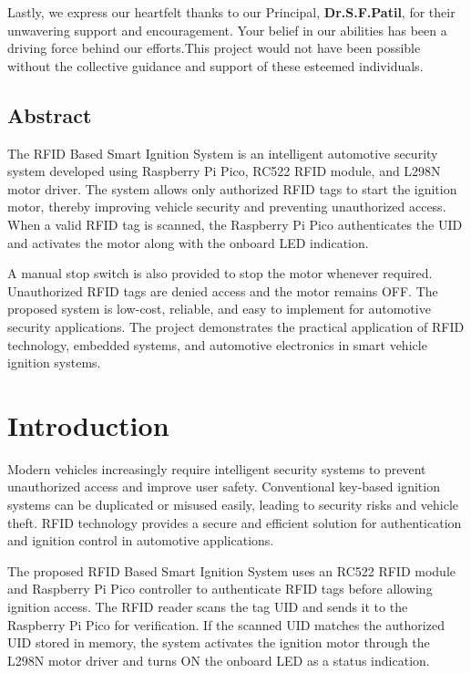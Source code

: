 \documentclass[12pt,a4paper,oneside]{report}
\begin{document}
Lastly, we express our heartfelt thanks to our Principal, \textbf{Dr.S.F.Patil}, for their unwavering support and encouragement. Your belief in our abilities has been a
driving force behind our efforts.This project would not have been possible
without the collective guidance and support of these esteemed individuals.
\newpage
\large\section*{Abstract}

The RFID Based Smart Ignition System is an intelligent automotive security system developed using Raspberry Pi Pico, RC522 RFID module, and L298N motor driver. The system allows only authorized RFID tags to start the ignition motor, thereby improving vehicle security and preventing unauthorized access. When a valid RFID tag is scanned, the Raspberry Pi Pico authenticates the UID and activates the motor along with the onboard LED indication.

A manual stop switch is also provided to stop the motor whenever required. Unauthorized RFID tags are denied access and the motor remains OFF. The proposed system is low-cost, reliable, and easy to implement for automotive security applications. The project demonstrates the practical application of RFID technology, embedded systems, and automotive electronics in smart vehicle ignition systems.

\newpage
\tableofcontents
\newpage


\chapter{Introduction}

Modern vehicles increasingly require intelligent security systems to prevent unauthorized access and improve user safety. Conventional key-based ignition systems can be duplicated or misused easily, leading to security risks and vehicle theft. RFID technology provides a secure and efficient solution for authentication and ignition control in automotive applications.

The proposed RFID Based Smart Ignition System uses an RC522 RFID module and Raspberry Pi Pico controller to authenticate RFID tags before allowing ignition access. The RFID reader scans the tag UID and sends it to the Raspberry Pi Pico for verification. If the scanned UID matches the authorized UID stored in memory, the system activates the ignition motor through the L298N motor driver and turns ON the onboard LED as a status indication.
\end{document}
